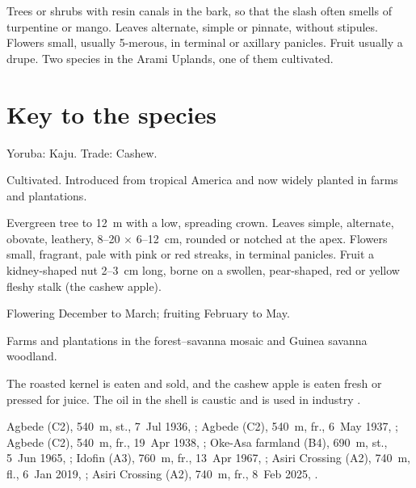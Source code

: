 \label{fam:anacardiaceae}

Trees or shrubs with resin canals in the bark, so that the slash often
smells of turpentine or mango. Leaves alternate, simple or pinnate,
without stipules. Flowers small, usually 5-merous, in terminal or
axillary panicles. Fruit usually a drupe. Two species in the Arami
Uplands, one of them cultivated.

\section*{Key to the species}
\begin{florakey}
\end{florakey}

\label{sp:ANA01}

 Yoruba: Kaju. Trade: Cashew.

 Cultivated. Introduced from tropical America and now
widely planted in farms and plantations.

 Evergreen tree to 12~m with a low, spreading
crown. Leaves simple, alternate, obovate, leathery, 8--20
$\times$ 6--12~cm, rounded or notched at the apex. Flowers small,
fragrant, pale with pink or red streaks, in terminal panicles. Fruit a
kidney-shaped nut 2--3~cm long, borne on a swollen, pear-shaped, red
or yellow fleshy stalk (the cashew apple).

 Flowering December to March; fruiting February to
May.

 Farms and plantations in the forest--savanna mosaic
and Guinea savanna woodland.

 The roasted kernel is eaten and sold, and the cashew
apple is eaten fresh or pressed for juice. The oil in the shell is
caustic and is used in industry \citep{burkill1985,orwa2009}.

 Agbede (C2), 540~m, st., 7~Jul 1936, ;
Agbede (C2), 540~m, fr., 6~May 1937, ;
Agbede (C2), 540~m, fr., 19~Apr 1938, ;
Oke-Asa farmland (B4), 690~m, st., 5~Jun 1965, ;
Idofin (A3), 760~m, fr., 13~Apr 1967, ;
Asiri Crossing (A2), 740~m, fl., 6~Jan 2019, ;
Asiri Crossing (A2), 740~m, fr., 8~Feb 2025, .

